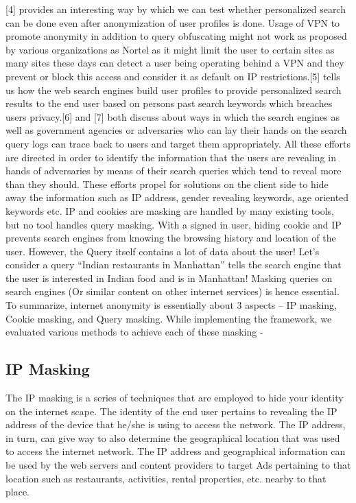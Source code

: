 \documentclass[10pt, a4paper, twocolumn]{article} %
\begin{document}
[4] provides an interesting way by which we can test whether personalized search can be done even after anonymization of user profiles is done. Usage of VPN to promote anonymity in addition to query obfuscating might not work as proposed by various organizations as Nortel as it might limit the user to certain sites as many sites these days can detect a user being operating behind a VPN and they prevent or block this access and consider it as default on IP restrictions.[5] tells us how the web search engines build user profiles to provide personalized search results to the end user based on persons past search keywords which breaches users privacy.[6] and [7] both discuss about ways in which the search engines as well as government agencies or adversaries who can lay their hands on the search query logs can trace back to users and target them appropriately. All these efforts are directed in order to identify the information that the users are revealing in hands of adversaries by means of their search queries which tend to reveal more than they should. These efforts propel for solutions on the client side to hide away the information such as IP address, gender revealing keywords, age oriented keywords etc.\newline
IP and cookies are masking are handled by many existing tools, but no tool handles query masking. With a signed in user, hiding cookie and IP prevents search engines from knowing the browsing history and location of the user. However, the Query itself contains a lot of data about the user! Let’s consider a query “Indian restaurants in Manhattan” tells the search engine that the user is interested in Indian food and is in Manhattan! Masking queries on search engines (Or similar content on other internet services) is hence essential. To summarize, internet anonymity is essentially about 3 aspects – IP masking, Cookie masking, and Query masking. \newline
While implementing the framework, we evaluated various methods to achieve each of these masking -
\subsection{IP Masking}
The IP masking is a series of techniques that are employed to hide your identity on the internet scape. The identity of the end user pertains to revealing the IP address of the device that he/she is using to access the network. The IP address, in turn, can give way to also determine the geographical location that was used to access the internet network. The IP address and geographical information can be used by the web servers and content providers to target Ads pertaining to that location such as restaurants, activities, rental properties, etc. nearby to that place.\newline 
\end{document}
